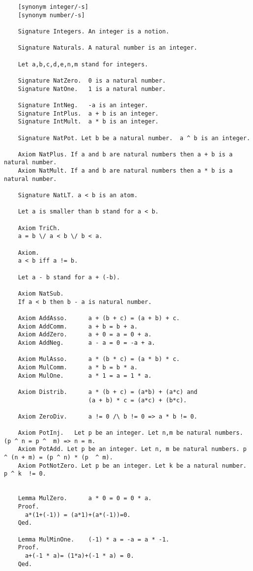 \documentclass[a4paper,12pt]{scrartcl}
\begin{document}
\begin{lstlisting}
	[synonym integer/-s]
	[synonym number/-s]
	
	Signature Integers. An integer is a notion.
	
	Signature Naturals. A natural number is an integer.
	
	Let a,b,c,d,e,n,m stand for integers.
	
	Signature NatZero.  0 is a natural number.
	Signature NatOne.   1 is a natural number.
	
	Signature IntNeg.   -a is an integer.
	Signature IntPlus.  a + b is an integer.
	Signature IntMult.  a * b is an integer.
	
    Signature NatPot. Let b be a natural number.  a ^ b is an integer.
    
	Axiom NatPlus. If a and b are natural numbers then a + b is a natural number.
	Axiom NatMult. If a and b are natural numbers then a * b is a natural number.
	
	Signature NatLT. a < b is an atom.
	
	Let a is smaller than b stand for a < b.
	
	Axiom TriCh.
	a = b \/ a < b \/ b < a.
	
	Axiom.
	a < b iff a != b.
	
	Let a - b stand for a + (-b).
	
	Axiom NatSub.
	If a < b then b - a is natural number.
	
	Axiom AddAsso.      a + (b + c) = (a + b) + c.
	Axiom AddComm.      a + b = b + a.
	Axiom AddZero.      a + 0 = a = 0 + a.
	Axiom AddNeg.       a - a = 0 = -a + a.
	
	Axiom MulAsso.      a * (b * c) = (a * b) * c.
	Axiom MulComm.      a * b = b * a.
	Axiom MulOne.       a * 1 = a = 1 * a.
	
	Axiom Distrib.      a * (b + c) = (a*b) + (a*c) and
						(a + b) * c = (a*c) + (b*c).
	
	Axiom ZeroDiv.      a != 0 /\ b != 0 => a * b != 0.
	
	Axiom PotInj.   Let p be an integer. Let n,m be natural numbers. (p ^ n = p ^  m) => n = m.
	Axiom PotAdd. Let p be an integer. Let n, m be natural numbers. p ^ (n + m) = (p ^ n) * (p  ^ m).
	Axiom PotNotZero. Let p be an integer. Let k be a natural number. p ^ k  != 0.
	
	
	Lemma MulZero.      a * 0 = 0 = 0 * a.
	Proof.
	  a*(1+(-1)) = (a*1)+(a*(-1))=0.
	Qed.
	
	Lemma MulMinOne.    (-1) * a = -a = a * -1.
	Proof.
	  a+(-1 * a)= (1*a)+(-1 * a) = 0.
	Qed.
	

\end{lstlisting}
\end{document}
